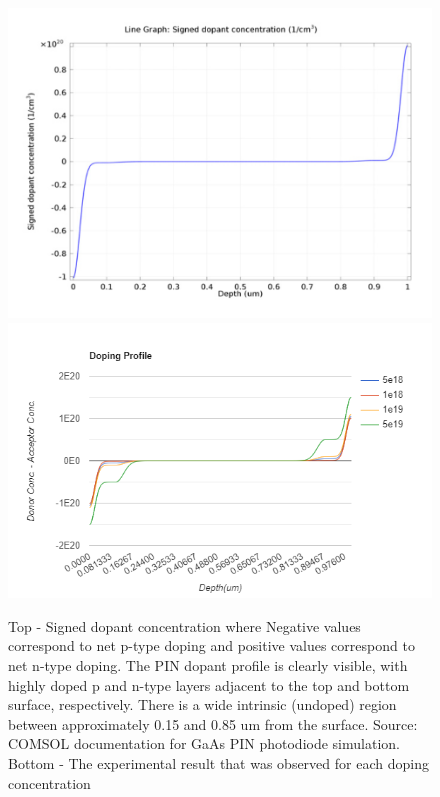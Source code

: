 \documentclass[conference]{IEEEtran}
\begin{document}
\begin{figure}
\begin{center}
\includegraphics[scale = 0.3]{Dopant.png}
\includegraphics[scale = 0.4]{doping profile.png}
\caption{Top - Signed dopant concentration where Negative values correspond to net p-type doping and positive values correspond to net n-type doping. The PIN dopant profile is clearly visible, with highly doped p and n-type layers adjacent to the top and bottom surface, respectively. There is a wide intrinsic (undoped) region between approximately 0.15 and 0.85 um from the surface. Source: COMSOL documentation for GaAs PIN photodiode simulation. Bottom - The experimental result that was observed for each doping concentration}
\end{center}
\end{figure}
\end{document}
